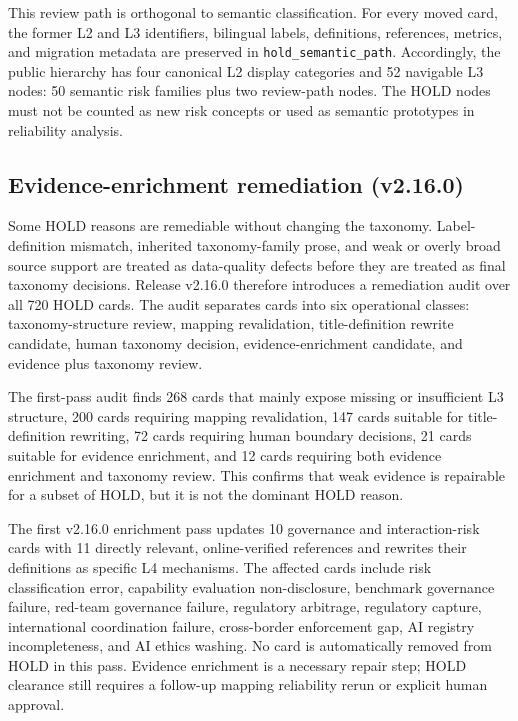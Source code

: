\documentclass[11pt,a4paper]{article}
\newcommand{\code}[1]{\texttt{#1}}
\begin{document}
\begin{appendices}
This review path is orthogonal to semantic classification. For every moved
card, the former L2 and L3 identifiers, bilingual labels, definitions,
references, metrics, and migration metadata are preserved in
\code{hold\_semantic\_path}. Accordingly, the public hierarchy has four
canonical L2 display categories and 52 navigable L3 nodes: 50 semantic risk
families plus two review-path nodes. The HOLD nodes must not be counted as new
risk concepts or used as semantic prototypes in reliability analysis.

\subsection{Evidence-enrichment remediation (v2.16.0)}

Some HOLD reasons are remediable without changing the taxonomy. Label-definition
mismatch, inherited taxonomy-family prose, and weak or overly broad source
support are treated as data-quality defects before they are treated as final
taxonomy decisions. Release v2.16.0 therefore introduces a remediation audit
over all 720 HOLD cards. The audit separates cards into six operational
classes: taxonomy-structure review, mapping revalidation, title-definition
rewrite candidate, human taxonomy decision, evidence-enrichment candidate, and
evidence plus taxonomy review.

The first-pass audit finds 268 cards that mainly expose missing or insufficient
L3 structure, 200 cards requiring mapping revalidation, 147 cards suitable for
title-definition rewriting, 72 cards requiring human boundary decisions, 21
cards suitable for evidence enrichment, and 12 cards requiring both evidence
enrichment and taxonomy review. This confirms that weak evidence is repairable
for a subset of HOLD, but it is not the dominant HOLD reason.

The first v2.16.0 enrichment pass updates 10 governance and interaction-risk
cards with 11 directly relevant, online-verified references and rewrites their
definitions as specific L4 mechanisms. The affected cards include risk
classification error, capability evaluation non-disclosure, benchmark
governance failure, red-team governance failure, regulatory arbitrage,
regulatory capture, international coordination failure, cross-border
enforcement gap, AI registry incompleteness, and AI ethics washing. No card is
automatically removed from HOLD in this pass. Evidence enrichment is a
necessary repair step; HOLD clearance still requires a follow-up mapping
reliability rerun or explicit human approval.


\end{appendices}
\end{document}
